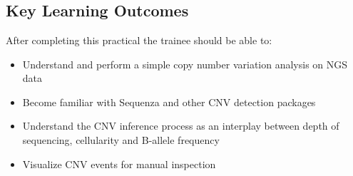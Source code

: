 



\chapter{\moduleTitle}


\newpage


\section{Key Learning Outcomes}

After completing this practical the trainee should be able to:

\begin{itemize}
  \item Understand and perform a simple copy number variation analysis on NGS data
  \item Become familiar with Sequenza and other CNV detection packages
  \item Understand the CNV inference process as an interplay between depth of sequencing, cellularity and B-allele frequency
  \item Visualize CNV events for manual inspection
\end{itemize}

